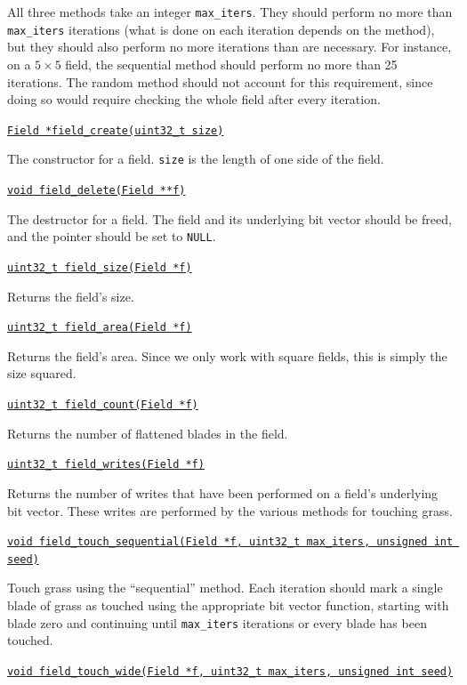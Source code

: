 \documentclass[11pt]{article}
\begin{document}
All three methods take an integer \texttt{max\_iters}. They should perform no more than \texttt{max\_iters} iterations (what is done on each iteration depends on the method), but they should also perform no more iterations than are necessary. For instance, on a $5 \times 5$ field, the sequential method should perform no more than 25 iterations. The random method should not account for this requirement, since doing so would require checking the whole field after every iteration.

\setlength{\parindent}{0pt}
\setlength{\parskip}{6pt}

\underline{\texttt{Field *field\_create(uint32\_t size)}}

The constructor for a field. \texttt{size} is the length of one side of the field.
\medskip

\underline{\texttt{void field\_delete(Field **f)}}

The destructor for a field. The field and its underlying bit vector should be freed, and the pointer should be set to \texttt{NULL}.
\medskip

\underline{\texttt{uint32\_t field\_size(Field *f)}}

Returns the field's size.
\medskip

\underline{\texttt{uint32\_t field\_area(Field *f)}}

Returns the field's area. Since we only work with square fields, this is simply the size squared.
\medskip

\underline{\texttt{uint32\_t field\_count(Field *f)}}

Returns the number of flattened blades in the field.
\medskip

\underline{\texttt{uint32\_t field\_writes(Field *f)}}

Returns the number of writes that have been performed on a field's underlying bit vector. These writes are performed by the various methods for touching grass.
\medskip

\underline{\texttt{void field\_touch\_sequential(Field *f, uint32\_t max\_iters, unsigned int seed)}}

Touch grass using the ``sequential'' method. Each iteration should mark a single blade of grass as touched using the appropriate bit vector function, starting with blade zero and continuing until \texttt{max\_iters} iterations or every blade has been touched.
\medskip

\underline{\texttt{void field\_touch\_wide(Field *f, uint32\_t max\_iters, unsigned int seed)}}
\end{document}
